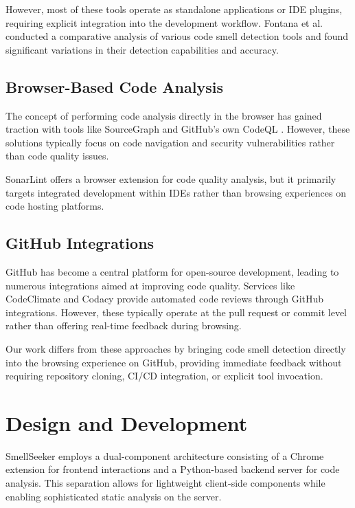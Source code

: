 \documentclass[sigconf,screen]{acmart}
\begin{document}
However, most of these tools operate as standalone applications or IDE plugins, requiring explicit integration into the development workflow. Fontana et al. \cite{fontana2012comparing} conducted a comparative analysis of various code smell detection tools and found significant variations in their detection capabilities and accuracy.

\subsection{Browser-Based Code Analysis}

The concept of performing code analysis directly in the browser has gained traction with tools like SourceGraph \cite{sourcegraph2021} and GitHub's own CodeQL \cite{codeql2021}. However, these solutions typically focus on code navigation and security vulnerabilities rather than code quality issues.

SonarLint \cite{sonarlint2021} offers a browser extension for code quality analysis, but it primarily targets integrated development within IDEs rather than browsing experiences on code hosting platforms.

\subsection{GitHub Integrations}

GitHub has become a central platform for open-source development, leading to numerous integrations aimed at improving code quality. Services like CodeClimate \cite{codeclimate2021} and Codacy \cite{codacy2021} provide automated code reviews through GitHub integrations. However, these typically operate at the pull request or commit level rather than offering real-time feedback during browsing.

Our work differs from these approaches by bringing code smell detection directly into the browsing experience on GitHub, providing immediate feedback without requiring repository cloning, CI/CD integration, or explicit tool invocation.

\section{Design and Development}

SmellSeeker employs a dual-component architecture consisting of a Chrome extension for frontend interactions and a Python-based backend server for code analysis. This separation allows for lightweight client-side components while enabling sophisticated static analysis on the server.
\end{document}
